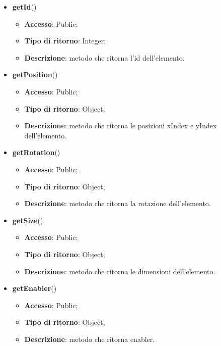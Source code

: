 {{{\begin{itemize}
\begin{itemize}
				\item \textbf{Tipo di ritorno}: Void;
				\item \textbf{Descrizione}: metodo che ritorna executed.
			\end{itemize}
			\item \textbf{getId}()
			\begin{itemize}
				\item \textbf{Accesso}: Public;
				\item \textbf{Tipo di ritorno}: Integer;
				\item \textbf{Descrizione}: metodo che ritorna l'id dell'elemento.
			\end{itemize}
			\item \textbf{getPosition}()
			\begin{itemize}
				\item \textbf{Accesso}: Public;
				\item \textbf{Tipo di ritorno}: Object;
				\item \textbf{Descrizione}: metodo che ritorna le posizioni xIndex e yIndex dell'elemento.
			\end{itemize}
			\item \textbf{getRotation}()
			\begin{itemize}
				\item \textbf{Accesso}: Public;
				\item \textbf{Tipo di ritorno}: Object;
				\item \textbf{Descrizione}: metodo che ritorna la rotazione dell'elemento.
			\end{itemize}
			\item \textbf{getSize}()
			\begin{itemize}
				\item \textbf{Accesso}: Public;
				\item \textbf{Tipo di ritorno}: Object;
				\item \textbf{Descrizione}: metodo che ritorna le dimensioni dell'elemento.
			\end{itemize}
			\item \textbf{getEnabler}()
			\begin{itemize}
				\item \textbf{Accesso}: Public;
				\item \textbf{Tipo di ritorno}: Object;
				\item \textbf{Descrizione}: metodo che ritorna enabler.
			\end{itemize}
		\end{itemize}
}}}
